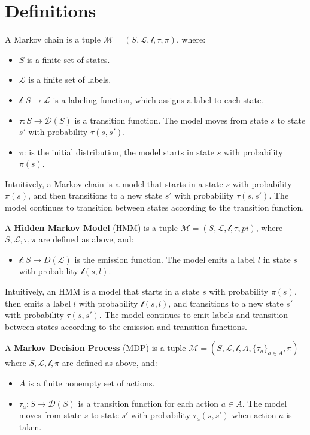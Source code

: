 \section{Definitions}\label{sec:definitions}
\begin{definition}
    A Markov chain is a tuple $\mathcal{M} = (S, \mathcal{L}, \mathcal{l}, \tau, \pi)$, where:
    \begin{itemize}
        \item $S$ is a finite set of states.
        \item $\mathcal{L}$ is a finite set of labels.
        \item $\mathcal{l}: S \rightarrow \mathcal{L}$ is a labeling function, which assigns a label to each state.
        \item $\tau: S \rightarrow \mathcal{D}(S)$ is a transition function. The model moves from state $s$ to state $s'$ with probability $\tau(s, s')$.
        \item $\pi$: is the initial distribution, the model starts in state $s$ with probability $\pi(s)$.
    \end{itemize}
\end{definition}

Intuitively, a Markov chain is a model that starts in a state $s$ with probability $\pi(s)$, and then transitions to a new state $s'$ with probability $\tau(s, s')$. The model continues to transition between states according to the transition function.


\begin{definition}
    A \textbf{Hidden Markov Model} (HMM) is a tuple $\mathcal{M} = (S, \mathcal{L}, \mathcal{l}, \tau,  pi)$, where $S, \mathcal{L}, \tau, \pi$
    are defined as above, and:
    \begin{itemize}
        \item $\mathcal{l}: S \rightarrow D(\mathcal{L})$ is the emission function. The model emits a label $l$ in state $s$ with probability $\mathcal{l}(s, l)$.  
    \end{itemize}
\end{definition}

Intuitively, an HMM is a model that starts in a state $s$ with probability $\pi(s)$, then emits a label $l$ with probability $\mathcal{l}(s, l)$, and transitions to a new state $s'$ with probability $\tau(s, s')$. The model continues to emit labels and transition between states according to the emission and transition functions.

\begin{definition}
    A \textbf{Markov Decision Process} (MDP) is a tuple $\mathcal{M} = (S, \mathcal{L}, \mathcal{l}, A, \{\tau_a\}_{a \in A}, \pi)$ where $S, \mathcal{L}, \mathcal{l}, \pi$ are defined as above, and:
    \begin{itemize}
        \item $A$ is a finite nonempty set of actions.
        \item $\tau_a: S \rightarrow \mathcal{D}(S)$ is a transition function for each action $a \in A$. The model moves from state $s$ to state $s'$ with probability $\tau_a(s, s')$ when action $a$ is taken.
    \end{itemize}
\end{definition}

